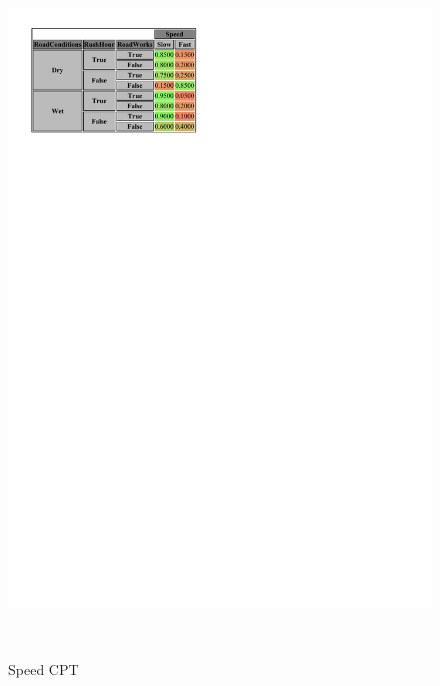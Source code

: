 \documentclass[a4paper,12pt]{article} %
\begin{document}
\begin{figure}[H]
\begin{center}
	\centering
	\begin{minipage}[c]{.5\textwidth}
		\centering
		\includegraphics[width=\linewidth]{../code/speed.pdf}	
		\caption*{Speed CPT}
		\label{fig:speed}
	\end{minipage}
	~
	\begin{minipage}[c]{.45\textwidth}
		\centering

\end{minipage}
\end{center}
\end{figure}
\end{document}
